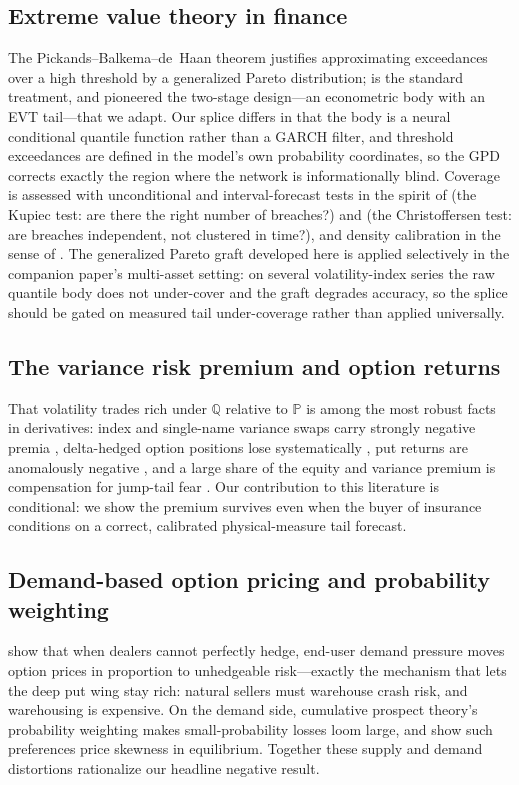 \documentclass[11pt]{article}
\newcommand{\Q}{\mathbb{Q}}
\newcommand{\PP}{\mathbb{P}}
\begin{document}
\subsection{Extreme value theory in finance}
The Pickands--Balkema--de~Haan theorem \citep{pickands1975, balkema1974} justifies approximating exceedances over a high threshold by a generalized Pareto distribution; \citet{embrechts1997} is the standard treatment, and \citet{mcneilfrey2000} pioneered the two-stage design---an econometric body with an EVT tail---that we adapt. Our splice differs in that the body is a neural conditional quantile function rather than a GARCH filter, and threshold exceedances are defined in the model's own probability coordinates, so the GPD corrects exactly the region where the network is informationally blind. Coverage is assessed with unconditional and interval-forecast tests in the spirit of \citet{kupiec1995} (the Kupiec test: are there the right number of breaches?) and \citet{christoffersen1998} (the Christoffersen test: are breaches independent, not clustered in time?), and density calibration in the sense of \citet{dieboldgunthertay1998}. The generalized Pareto graft developed here is applied selectively in the companion paper's multi-asset setting: on several volatility-index series the raw quantile body does not under-cover and the graft degrades accuracy, so the splice should be gated on measured tail under-coverage rather than applied universally.

\subsection{The variance risk premium and option returns}
That volatility trades rich under $\Q$ relative to $\PP$ is among the most robust facts in derivatives: index and single-name variance swaps carry strongly negative premia \citep{carrwu2009}, delta-hedged option positions lose systematically \citep{bakshikapadia2003}, put returns are anomalously negative \citep{coval2001, bondarenko2014}, and a large share of the equity and variance premium is compensation for jump-tail fear \citep{bollerslevtodorov2011}. Our contribution to this literature is conditional: we show the premium survives even when the buyer of insurance conditions on a correct, calibrated physical-measure tail forecast.

\subsection{Demand-based option pricing and probability weighting}
\citet{garleanu2009} show that when dealers cannot perfectly hedge, end-user demand pressure moves option prices in proportion to unhedgeable risk---exactly the mechanism that lets the deep put wing stay rich: natural sellers must warehouse crash risk, and warehousing is expensive. On the demand side, cumulative prospect theory's probability weighting \citep{tversky1992} makes small-probability losses loom large, and \citet{barberishuang2008} show such preferences price skewness in equilibrium. Together these supply and demand distortions rationalize our headline negative result.
\end{document}
